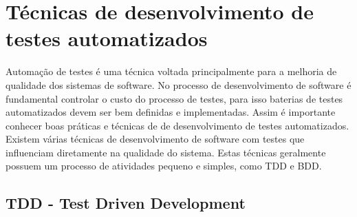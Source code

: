 \begin{enumerate}
\end{enumerate}

\section{Técnicas de desenvolvimento de testes automatizados}

Automação de testes é uma técnica voltada principalmente para a melhoria de 
qualidade dos sistemas de software. 
%
No processo de desenvolvimento de software é fundamental controlar o custo do 
processo de testes, para isso baterias de testes automatizados devem ser bem 
definidas e implementadas. Assim é importante conhecer boas práticas e técnicas 
de de desenvolvimento de testes automatizados.    
%
Existem várias técnicas de desenvolvimento de software com testes que influenciam 
diretamente na qualidade do sistema. Estas técnicas geralmente possuem um processo 
de atividades pequeno e simples, como TDD e BDD.

\subsection{TDD - Test Driven Development}

